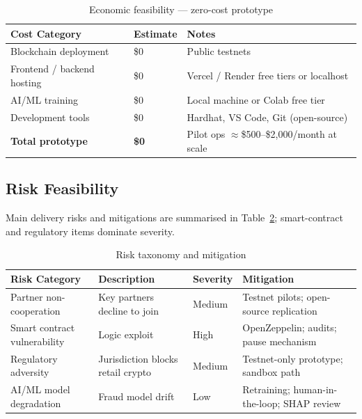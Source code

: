 \documentclass[12pt, a4paper]{report}
\newcommand{\tableheadcolor}{\rowcolor{TableHeadBg}}
\begin{document}
\begin{table}[H]
\centering
\caption[Economic feasibility --- zero-cost prototype]{Economic feasibility --- zero-cost prototype}
\label{tab:economic-feasibility}
\begin{tabular}{p{4cm}p{2.5cm}p{7cm}}
\toprule
\tableheadcolor
\textbf{Cost Category} & \textbf{Estimate} & \textbf{Notes} \\
\midrule
Blockchain deployment & \$0 & Public testnets \\
Frontend / backend hosting & \$0 & Vercel / Render free tiers or localhost \\
AI/ML training & \$0 & Local machine or Colab free tier \\
Development tools & \$0 & Hardhat, VS Code, Git (open-source) \\
\textbf{Total prototype} & \textbf{\$0} & Pilot ops $\approx$\$500--\$2{,}000/month at scale \\
\bottomrule
\end{tabular}
\end{table}

\vspace{2pt}

\subsection{Risk Feasibility}

Main delivery risks and mitigations are summarised in Table~\ref{tab:risk-taxonomy}; smart-contract and regulatory items dominate severity.

\begin{table}[H]
\centering
\caption[Risk taxonomy and mitigation]{Risk taxonomy and mitigation}
\label{tab:risk-taxonomy}
\begin{tabular}{p{3cm}p{4cm}p{1.5cm}p{5cm}}
\toprule
\tableheadcolor
\textbf{Risk Category} & \textbf{Description} & \textbf{Severity} & \textbf{Mitigation} \\
\midrule
Partner non-cooperation & Key partners decline to join & Medium & Testnet pilots; open-source replication \\
Smart contract vulnerability & Logic exploit & High & OpenZeppelin; audits; pause mechanism \\
Regulatory adversity & Jurisdiction blocks retail crypto & Medium & Testnet-only prototype; sandbox path \\
AI/ML model degradation & Fraud model drift & Low & Retraining; human-in-the-loop; SHAP review \\
\bottomrule
\end{tabular}
\end{table}
\end{document}
